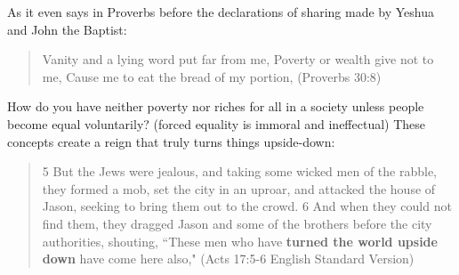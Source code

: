\documentclass[11pt]{article}
\begin{document}
As it even says in Proverbs before the declarations of sharing made by Yeshua and John the Baptist: 
\begin{quote}
Vanity and a lying word put far from me, Poverty or wealth give not to me, Cause me to eat the bread of my portion, (Proverbs 30:8)
\end{quote}
How do you have neither poverty nor riches for all in a society unless people become equal voluntarily? (forced equality is immoral and ineffectual) These concepts create a reign that truly turns things upside-down:
\begin{quote}
5 But the Jews were jealous, and taking some wicked men of the rabble, they formed a mob, set the city in an uproar, and attacked the house of Jason, seeking to bring them out to the crowd. 6 And when they could not find them, they dragged Jason and some of the brothers before the city authorities, shouting, “These men who have  \textbf{turned the world upside down} have come here also," (Acts 17:5-6 English Standard Version)
\end{quote}
\end{document}
